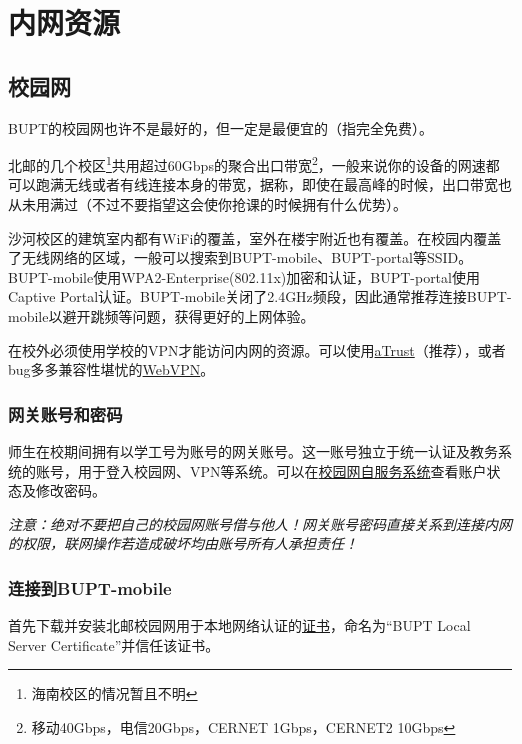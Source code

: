 \section{内网资源}

\subsection{校园网}

BUPT的校园网也许不是最好的，但一定是最便宜的（指完全免费）。

北邮的几个校区\footnote{海南校区的情况暂且不明}共用超过60Gbps的聚合出口带宽\footnote{移动40Gbps，电信20Gbps，CERNET 1Gbps，CERNET2 10Gbps}，一般来说你的设备的网速都可以跑满无线或者有线连接本身的带宽，据称，即使在最高峰的时候，出口带宽也从未用满过（不过不要指望这会使你抢课的时候拥有什么优势）。

沙河校区的建筑室内都有WiFi的覆盖，室外在楼宇附近也有覆盖。在校园内覆盖了无线网络的区域，一般可以搜索到BUPT-mobile、BUPT-portal等SSID。BUPT-mobile使用WPA2-Enterprise(802.11x)加密和认证，BUPT-portal使用Captive Portal认证。BUPT-mobile关闭了2.4GHz频段，因此通常推荐连接BUPT-mobile以避开跳频等问题，获得更好的上网体验。

在校外必须使用学校的VPN才能访问内网的资源。可以使用\href{https://vpn.bupt.edu.cn/}{aTrust}（推荐），或者bug多多兼容性堪忧的\href{https://webvpn.bupt.edu.cn/}{WebVPN}。

\subsubsection*{网关账号和密码}

师生在校期间拥有以学工号为账号的网关账号。这一账号独立于统一认证及教务系统的账号，用于登入校园网、VPN等系统。可以在\href{https://netaccount.bupt.edu.cn/}{校园网自服务系统}查看账户状态及修改密码。

\emph{注意：绝对不要把自己的校园网账号借与他人！网关账号密码直接关系到连接内网的权限，联网操作若造成破坏均由账号所有人承担责任！}

\subsubsection*{连接到BUPT-mobile}

首先下载并安装北邮校园网用于本地网络认证的\href{https://github.com/FredericDT/BUPTCampusNetworkManual/blob/master/Wireless/XTC-BUPT-mobile-assets/BUPT-Local-Server-Certificate.crt}{证书}，命名为“BUPT Local Server Certificate”并信任该证书。

